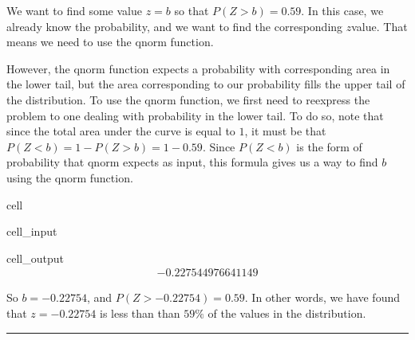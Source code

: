 \documentclass[letterpaper,10pt,english]{jupyterBook}
\begin{document}
\sphinxAtStartPar
We want to find some value \(z = b\) so that \(P(Z > b) = 0.59\). In this case, we already know the probability, and we want to find the corresponding \(z\)\sphinxhyphen{}value. That means we need to use the qnorm function.

\sphinxAtStartPar
However, the qnorm function expects a probability with corresponding area in the lower tail, but the area corresponding to our probability fills the upper tail of the distribution. To use the qnorm function, we first need to re\sphinxhyphen{}express the problem to one dealing with probability in the lower tail. To do so, note that since the total area under the curve is equal to \(1\), it must be that \(P(Z < b) = 1 - P(Z > b) = 1 - 0.59\). Since \(P(Z < b)\) is the form of probability that qnorm expects as input, this formula gives us a way to find \(b\) using the qnorm function.

\begin{sphinxuseclass}{cell}\begin{sphinxVerbatimInput}

\begin{sphinxuseclass}{cell_input}
\begin{sphinxVerbatim}[commandchars=\\\{\}]
\end{sphinxVerbatim}

\end{sphinxuseclass}\end{sphinxVerbatimInput}
\begin{sphinxVerbatimOutput}

\begin{sphinxuseclass}{cell_output}\begin{equation*}
\begin{split}-0.227544976641149\end{split}
\end{equation*}
\end{sphinxuseclass}\end{sphinxVerbatimOutput}

\end{sphinxuseclass}
\sphinxAtStartPar
So \(b = -0.22754\), and \(P(Z > -0.22754) = 0.59\). In other words, we have found that \(z = -0.22754\) is less than than \(59\%\) of the values in the distribution.


\bigskip\hrule\bigskip
\end{document}

